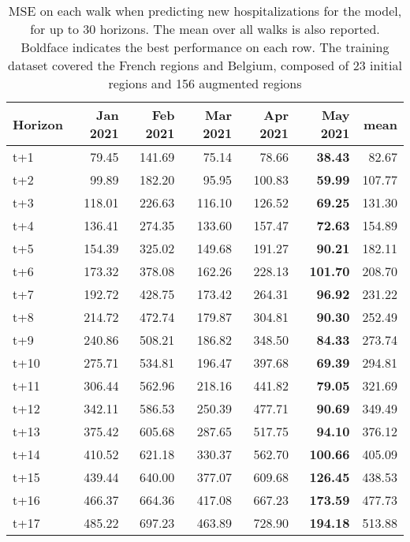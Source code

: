 \begin{table}[H]
\centering
\caption{MSE on each walk when predicting new hospitalizations for the model, for up to 30 horizons. The mean over all walks is also reported. Boldface indicates the best performance on each row. The training dataset covered the French regions and Belgium, composed of 23 initial regions and 156 augmented regions }
\label{tab:MSE_walk_assembly_0}
\begin{tabular}{lrrrrrr}
\toprule
Horizon &  Jan 2021 &  Feb 2021 &  Mar 2021 &  Apr 2021 &  May 2021 &    mean \\
\midrule
t+1  & 79.45  & 141.69  & 75.14  & 78.66  & \textbf{38.43}  & 82.67  \\
t+2  & 99.89  & 182.20  & 95.95  & 100.83  & \textbf{59.99}  & 107.77  \\
t+3  & 118.01  & 226.63  & 116.10  & 126.52  & \textbf{69.25}  & 131.30  \\
t+4  & 136.41  & 274.35  & 133.60  & 157.47  & \textbf{72.63}  & 154.89  \\
t+5  & 154.39  & 325.02  & 149.68  & 191.27  & \textbf{90.21}  & 182.11  \\
t+6  & 173.32  & 378.08  & 162.26  & 228.13  & \textbf{101.70}  & 208.70  \\
t+7  & 192.72  & 428.75  & 173.42  & 264.31  & \textbf{96.92}  & 231.22  \\
t+8  & 214.72  & 472.74  & 179.87  & 304.81  & \textbf{90.30}  & 252.49  \\
t+9  & 240.86  & 508.21  & 186.82  & 348.50  & \textbf{84.33}  & 273.74  \\
t+10  & 275.71  & 534.81  & 196.47  & 397.68  & \textbf{69.39}  & 294.81  \\
t+11  & 306.44  & 562.96  & 218.16  & 441.82  & \textbf{79.05}  & 321.69  \\
t+12  & 342.11  & 586.53  & 250.39  & 477.71  & \textbf{90.69}  & 349.49  \\
t+13  & 375.42  & 605.68  & 287.65  & 517.75  & \textbf{94.10}  & 376.12  \\
t+14  & 410.52  & 621.18  & 330.37  & 562.70  & \textbf{100.66}  & 405.09  \\
t+15  & 439.44  & 640.00  & 377.07  & 609.68  & \textbf{126.45}  & 438.53  \\
t+16  & 466.37  & 664.36  & 417.08  & 667.23  & \textbf{173.59}  & 477.73  \\
t+17  & 485.22  & 697.23  & 463.89  & 728.90  & \textbf{194.18}  & 513.88  \\

\end{tabular}
\end{table}
